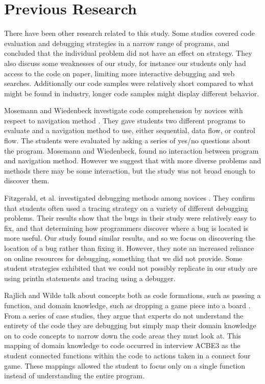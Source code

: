 \section{Previous Research}

There have been other research related to this study.
Some studies covered code evaluation and debugging strategies in a narrow range of programs,
 and concluded that the individual problem did not have an effect on strategy.
They also discuss some weaknesses of our study, for instance our students only had access to the code on paper, limiting more interactive debugging and web searches.
Additionally our code samples were relatively short compared to what might be found in industry,
 longer code samples might display different behavior.

Mosemann and Wiedenbeck investigate code comprehension by novices with respect to navigation method \cite{mosemann2001}.
They gave students two different programs to evaluate and a navigation method to use, either sequential, data flow, or control flow.
The students were evaluated by asking a series of yes/no questions about the program.
Mosemann and Wiedenbeck, found no interaction between program and navigation method.
However we suggest that with more diverse problems and methods there may be some interaction, but the study was not broad enough to discover them.

Fitzgerald, et al. investigated debugging methods among novices \cite{fitzgerald2008}.
They confirm that students often used a tracing strategy on a variety of different debugging problems.
Their results show that the bugs in their study were relatively easy to fix, and that determining how programmers discover where a bug is located is more useful.
Our study found similar results, and so we focus on discovering the location of a bug rather than fixing it.
However, they note an increased reliance on online resources for debugging, something that we did not provide.
Some student strategies exhibited that we could not possibly replicate in our study are using println statements and tracing using a debugger.

Rajlich and Wilde talk about concepts both as code formations, such as passing a function, and domain knowledge, such as dropping a game piece into a board \cite{1021348}.
From a series of case studies, they argue that experts do not understand the entirety of the code they are debugging but simply map their domain knowledge on to code concepts to narrow down the code areas they must look at.
This mapping of domain knowledge to code occurred in interview ACBE3 as the student connected functions within the code to actions taken in a connect four game.
These mappings allowed the student to focus only on a single function instead of understanding the entire program.

